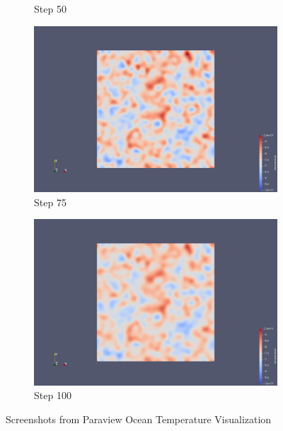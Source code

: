 \documentclass[a4paper,12pt]{article}
\begin{document}
\begin{figure}
\begin{subfigure}{0.4\textwidth}
    \caption{Step 50}
\end{subfigure}
\hfill
\begin{subfigure}{0.4\textwidth}
    \includegraphics[width=\textwidth]{../images/vtk/bonus/temp/step_75.png}
    \caption{Step 75}
\end{subfigure}

\begin{subfigure}{0.4\textwidth}
    \includegraphics[width=\textwidth]{../images/vtk/bonus/temp/step_100.png}
    \caption{Step 100}
\end{subfigure}
        
\caption{Screenshots from Paraview Ocean Temperature Visualization}
\end{figure}
\end{document}
